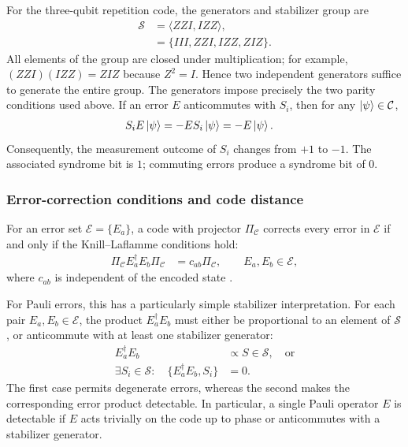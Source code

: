 \documentclass[amssymb,twocolumn,aps]{revtex4-2}
\begin{document}
For the three-qubit repetition code, the generators and stabilizer group are
\begin{align*}
    \mathcal S&=\langle ZZI,IZZ\rangle,\\
    &=\{III,ZZI,IZZ,ZIZ\}.
\end{align*}
All elements of the group are closed under multiplication; for example, $(ZZI)(IZZ)=ZIZ$ because $Z^2=I$. Hence two independent generators suffice to generate the entire group. The generators impose precisely the two parity conditions used above. If an error $E$ anticommutes with $S_i$, then for any $\ket{\psi}\in\mathcal C$,
\begin{align*}
    S_i E\ket{\psi}&=-E S_i\ket{\psi}
    =-E\ket{\psi}.
\end{align*}
Consequently, the measurement outcome of $S_i$ changes from $+1$ to $-1$. The associated syndrome bit is $1$; commuting errors produce a syndrome bit of $0$.

\subsubsection*{Error-correction conditions and code distance}

For an error set $\mathcal E=\{E_a\}$, a code with projector $\Pi_{\mathcal C}$ corrects every error in $\mathcal E$ if and only if the Knill--Laflamme conditions hold:
\begin{align*}
    \Pi_{\mathcal C}E_a^\dagger E_b\Pi_{\mathcal C}
    &=c_{ab}\Pi_{\mathcal C},
    \qquad E_a,E_b\in\mathcal E,
\end{align*}
where $c_{ab}$ is independent of the encoded state \cite{knill1997theory,gottesman2024surviving,nielsenchuang}.

For Pauli errors, this has a particularly simple stabilizer interpretation. For each pair $E_a,E_b\in\mathcal E$, the product $E_a^\dagger E_b$ must either be proportional to an element of $\mathcal S$, or anticommute with at least one stabilizer generator:
\begin{align*}
    E_a^\dagger E_b&\propto S\in\mathcal S,
    \quad\text{or}\\
    \exists S_i\in\mathcal S:\quad
    \{E_a^\dagger E_b,S_i\}&=0.
\end{align*}
The first case permits degenerate errors, whereas the second makes the corresponding error product detectable. In particular, a single Pauli operator $E$ is detectable if $E$ acts trivially on the code up to phase or anticommutes with a stabilizer generator.
\end{document}
